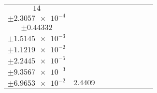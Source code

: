 \documentclass[8pt]{article}
\begin{document}
\begin{longtable}[l]{c c c c c c c c c}
$\num{14}$ & \begin{tabular}[c]{@{}c@{}}$\num{3.0296e-2}$ \\ $\pm\num{2.3057e-4}$\end{tabular} & \begin{tabular}[c]{@{}c@{}}$\num{0.11709}$ \\ $\pm\num{0.44332}$\end{tabular} & \begin{tabular}[c]{@{}c@{}}$\num{7.5564}$ \\ $\pm\num{1.5145e-3}$\end{tabular} & \begin{tabular}[c]{@{}c@{}}$\num{2.151e+3}$ \\ $\pm\num{1.1219e-2}$\end{tabular} & \begin{tabular}[c]{@{}c@{}}$\num{4.3031}$ \\ $\pm\num{2.2445e-5}$\end{tabular} & \begin{tabular}[c]{@{}c@{}}$\num{1.1603}$ \\ $\pm\num{9.3567e-3}$\end{tabular} & \begin{tabular}[c]{@{}c@{}}$\num{4.0826}$ \\ $\pm\num{6.9653e-2}$\end{tabular} & $\num{2.4409}$\\
\bottomrule
\end{longtable}
\end{document}
